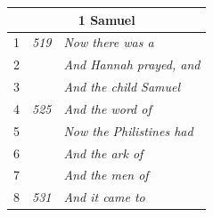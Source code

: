 \documentclass{article}
\newlength{\minipageheight}
\newlength{\minipagewidth}
\begin{document}
\begin{minipage}[r][\minipageheight][t]{\minipagewidth}
\begin{longtable}{ccl}
        \multicolumn{3}{c}{\textbf{1 Samuel}}                            \\
        \hline
        1           & \textit{519} & \textit{Now there was a}            \\
        2           &              & \textit{And Hannah prayed, and}     \\
        3           &              & \textit{And the child Samuel}       \\
        4           & \textit{525} & \textit{And the word of}            \\
        5           &              & \textit{Now the Philistines had}    \\
        6           &              & \textit{And the ark of}             \\
        7           &              & \textit{And the men of}             \\
        8           & \textit{531} & \textit{And it came to}             \\
    \end{longtable}
\end{minipage}%
%
%
\end{document}
